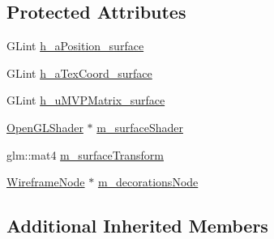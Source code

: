 \subsection*{Protected Attributes}
\begin{DoxyCompactItemize}
\item 
G\-Lint \hyperlink{classmotorcar_1_1WaylandSurfaceNode_ad84a5cb678618649d4bf24fe213c1a16}{h\-\_\-a\-Position\-\_\-surface}
\item 
G\-Lint \hyperlink{classmotorcar_1_1WaylandSurfaceNode_ac1c74d1cf0f8d5e0b91931a2c7422c99}{h\-\_\-a\-Tex\-Coord\-\_\-surface}
\item 
G\-Lint \hyperlink{classmotorcar_1_1WaylandSurfaceNode_a03d99abeed6e79376411286935b39c7d}{h\-\_\-u\-M\-V\-P\-Matrix\-\_\-surface}
\item 
\hyperlink{classmotorcar_1_1OpenGLShader}{Open\-G\-L\-Shader} $\ast$ \hyperlink{classmotorcar_1_1WaylandSurfaceNode_a78d92f66eb62093d34bde0aa4304c028}{m\-\_\-surface\-Shader}
\item 
glm\-::mat4 \hyperlink{classmotorcar_1_1WaylandSurfaceNode_a70da528843079f3bf566086bc4688ad4}{m\-\_\-surface\-Transform}
\item 
\hyperlink{classmotorcar_1_1WireframeNode}{Wireframe\-Node} $\ast$ \hyperlink{classmotorcar_1_1WaylandSurfaceNode_a72f5c39ec90685228602edfb9bd48e43}{m\-\_\-decorations\-Node}
\end{DoxyCompactItemize}
\subsection*{Additional Inherited Members}


